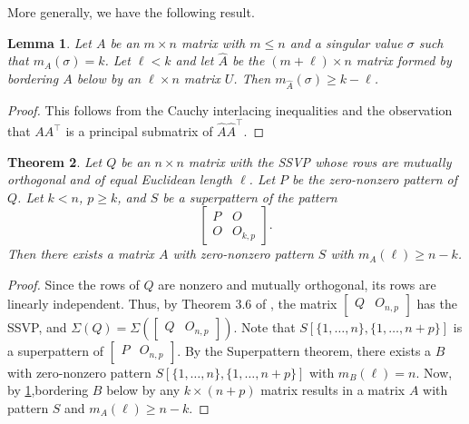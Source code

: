 \documentclass[preprint,12pt]{elsarticle}
\newcommand{\trans  }{^\top}
\newtheorem{theorem}{Theorem}[section]
\newtheorem{lemma}[theorem]{Lemma}
\begin{document}
More generally, we have the following result. 

\begin{lemma}

\label{borderow}
    Let $A$ be an $m \times n $  matrix with $m \leq n$  and a singular value $\sigma$ such that $m_A(\sigma) = k$. Let $\ell < k$ and let $\widehat{A}$ be the $(m+\ell)\times n$ matrix formed by bordering $A$ below by an $\ell \times n$ matrix $U$. Then $m_{\widehat{A}}(\sigma) \geq k-\ell$. 
\end{lemma}
\begin{proof}
This follows from the Cauchy interlacing inequalities and the observation that 
$AA\trans$ is a principal submatrix of 
$\widehat{A} \widehat{A}\trans$.
\end{proof}

\begin{theorem}
\label{orthogborder}
    Let $Q$ be an $n\times n$ matrix with the SSVP whose rows are mutually orthogonal and of equal Euclidean length $\ell$.
    Let $P$ be the zero-nonzero pattern of $Q$. 
    Let $k< n$, $p \geq k$, and $S$ be a superpattern of the pattern
    \[
    \left[
    \begin{array}{r|l}
         P & O  \\
         \hline
        O & O_{k,p}
    \end{array}
    \right].
    \]
    Then there exists a matrix $A$ with zero-nonzero pattern $S$ 
    with  $m_{A}(\ell) \geq n-k$.
\end{theorem}



\begin{proof}
    Since the rows  of  $Q$ are nonzero and mutually orthogonal, its rows are linearly independent.
    Thus, by Theorem 3.6 of \cite{cheung2025strongsingularvalueproperty},  the matrix $\left[ \begin{array}{c|c}Q  &  O_{n,p} \end{array} \right] $ has the SSVP, and $\Sigma(Q) = \Sigma(\left[ \begin{array}{c|c}Q  &  O_{n,p} \end{array} \right])$. Note 
    that $S[\{ 1, \ldots, n\}, \{1, \ldots, n+p\}]$  is a superpattern of $\left[ \begin{array}{c|c}P  &  O_{n,p} \end{array} \right] $. 
    By the Superpattern theorem, there exists a $B$ with zero-nonzero pattern $S[\{ 1, \ldots, n\}, \{1, \ldots, n+p\}]$  
   with  $m_B(\ell) = n$. Now, by \cref{borderow},bordering $B$ below by any $k\times (n + p)$ matrix results in a matrix $A$ with pattern $S$ and $m_A(\ell) \geq n - k$. 
\end{proof}
\end{document}
